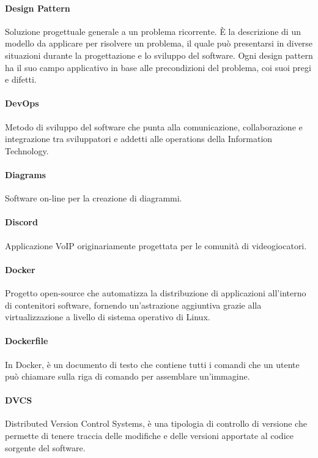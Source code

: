 \documentclass[]{article}
\begin{document}
	\paragraph*{Design Pattern}
	Soluzione progettuale generale a un problema ricorrente. È la descrizione di un modello da applicare per risolvere un problema, il quale può presentarsi in diverse situazioni durante la progettazione e lo sviluppo del software. Ogni design pattern ha il suo campo applicativo in base alle precondizioni del problema, coi suoi pregi e difetti.
	
	\paragraph*{DevOps}
	Metodo di sviluppo del software che punta alla comunicazione, collaborazione e integrazione tra sviluppatori e addetti alle operations della Information Technology.
	
	\paragraph*{Diagrams}
	Software on-line per la creazione di diagrammi.
	
	\paragraph*{Discord}
	Applicazione VoIP originariamente progettata per le comunità di videogiocatori.
	
	\paragraph*{Docker}
	Progetto open-source che automatizza la distribuzione di applicazioni all'interno di contenitori software, fornendo un'astrazione aggiuntiva grazie alla virtualizzazione a livello di sistema operativo di Linux.
	
	\paragraph*{Dockerfile}
	In Docker, è un documento di testo che contiene tutti i comandi che un utente può chiamare sulla riga di comando per assemblare un'immagine.
	
	\paragraph*{DVCS}
	Distributed Version Control Systems, è una tipologia di controllo di versione che permette di tenere traccia delle modifiche e delle versioni apportate al codice sorgente del software.
	
\end{document}
